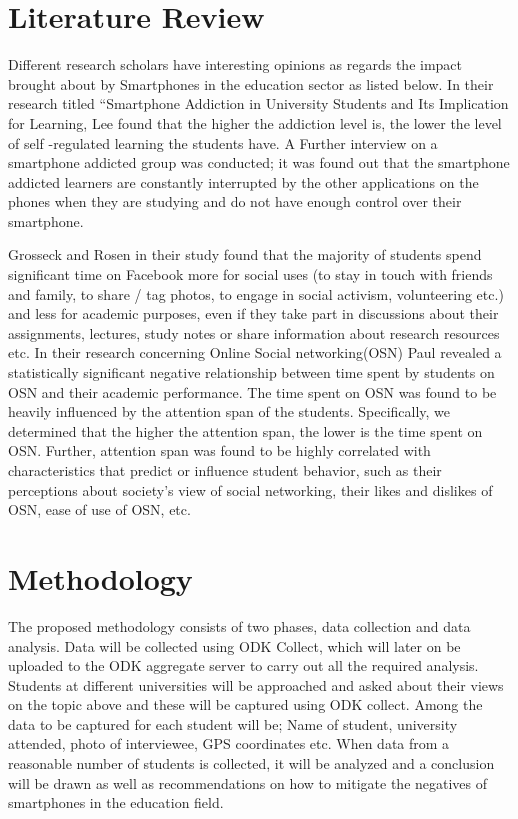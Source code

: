 \documentclass {article}
\begin{document}
\section{Literature Review}
Different  research scholars have interesting opinions as regards the impact brought about by Smartphones in the education sector as listed below.
In  their  research  titled  “Smartphone  Addiction  in University Students and Its Implication for Learning,  Lee  found  that  the  higher  the addiction  level  is,  the  lower the  level  of  self -regulated learning the students have. A  Further  interview on a   smartphone addicted group was conducted; it was found out that the smartphone addicted learners are constantly interrupted by  the other applications on the phones when they are studying and do not  have enough control over their  smartphone. 

Grosseck and  Rosen in their study found that the  majority  of  students  spend  significant  time  on Facebook  more  for  social  uses  (to  stay  in  touch  with friends and family, to share / tag photos, to engage in social   activism,   volunteering   etc.)   and   less   for academic purposes, even if they take  part  in discussions  about  their  assignments,  lectures,  study notes  or  share  information  about research  resources etc.
In their research concerning Online Social networking(OSN)   Paul  revealed a statistically significant negative relationship between  time  spent  by  students on  OSN and their academic performance.  The  time  spent  on  OSN  was found to be heavily influenced by the attention span of the  students.  Specifically,  we  determined  that  the higher  the attention span,  the lower  is the time spent on  OSN.  Further,  attention  span  was  found  to  be highly  correlated  with  characteristics  that  predict  or influence  student  behavior, such as their perceptions about society’s view of social networking, their likes and dislikes of OSN, ease of use of OSN, etc.




\section{Methodology}
The proposed methodology consists of two phases, data collection and data analysis.
Data  will  be  collected  using  ODK  Collect,  which  will  later  on  be  uploaded  to  the  ODK
aggregate  server  to  carry  out  all  the  required  analysis. Students at different universities will be approached and asked about their views on the topic above and these will be captured using ODK collect.
Among the data to be captured for each student will be;
Name of student, university attended, photo of interviewee, GPS coordinates etc.
When data from a reasonable number of students is collected, it will be analyzed and a conclusion will be drawn as well as recommendations on how to mitigate the negatives of smartphones in the education field.



\nocite{*}


\end{document}
